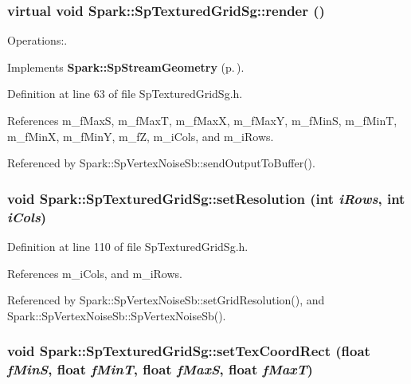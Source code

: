 \subsubsection{\setlength{\rightskip}{0pt plus 5cm}virtual void Spark::Sp\-Textured\-Grid\-Sg::render ()\hspace{0.3cm}{\tt  [inline, virtual]}}\label{classSpark_1_1SpTexturedGridSg_a2}


Operations:. 



Implements {\bf Spark::Sp\-Stream\-Geometry} {\rm (p.\,\pageref{classSpark_1_1SpStreamGeometry_a0})}.

Definition at line 63 of file Sp\-Textured\-Grid\-Sg.h.

References m\_\-f\-Max\-S, m\_\-f\-Max\-T, m\_\-f\-Max\-X, m\_\-f\-Max\-Y, m\_\-f\-Min\-S, m\_\-f\-Min\-T, m\_\-f\-Min\-X, m\_\-f\-Min\-Y, m\_\-f\-Z, m\_\-i\-Cols, and m\_\-i\-Rows.

Referenced by Spark::Sp\-Vertex\-Noise\-Sb::send\-Output\-To\-Buffer().
\subsubsection{\setlength{\rightskip}{0pt plus 5cm}void Spark::Sp\-Textured\-Grid\-Sg::set\-Resolution (int {\em i\-Rows}, int {\em i\-Cols})\hspace{0.3cm}{\tt  [inline]}}\label{classSpark_1_1SpTexturedGridSg_a3}


Definition at line 110 of file Sp\-Textured\-Grid\-Sg.h.

References m\_\-i\-Cols, and m\_\-i\-Rows.

Referenced by Spark::Sp\-Vertex\-Noise\-Sb::set\-Grid\-Resolution(), and Spark::Sp\-Vertex\-Noise\-Sb::Sp\-Vertex\-Noise\-Sb().
\subsubsection{\setlength{\rightskip}{0pt plus 5cm}void Spark::Sp\-Textured\-Grid\-Sg::set\-Tex\-Coord\-Rect (float {\em f\-Min\-S}, float {\em f\-Min\-T}, float {\em f\-Max\-S}, float {\em f\-Max\-T})\hspace{0.3cm}{\tt  [inline]}}\label{classSpark_1_1SpTexturedGridSg_a5}



